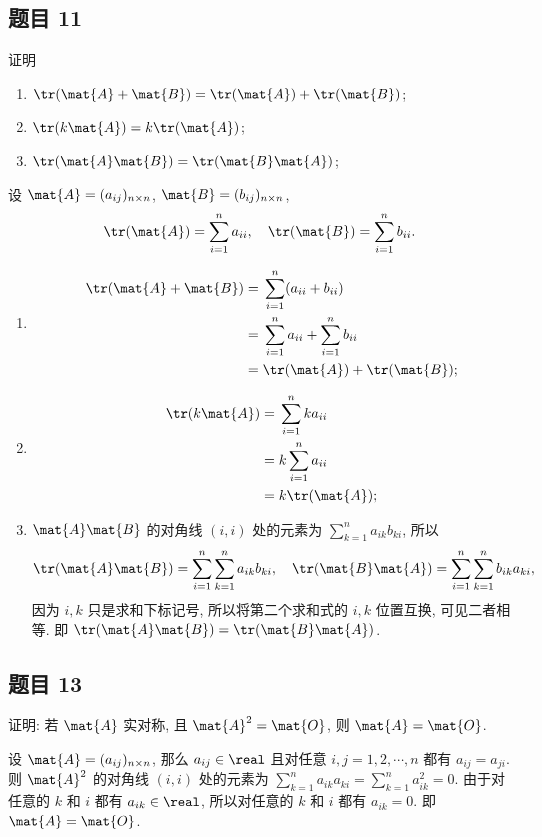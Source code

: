 \subsection*{题目 11}
\begin{problem*}
证明
\begin{enumerate}
    \item $\tr(\mat{A} + \mat{B}) = \tr(\mat{A}) + \tr(\mat{B})$;
    \item $\tr(k\mat{A}) = k\tr(\mat{A})$;
    \item $\tr(\mat{A}\mat{B}) = \tr(\mat{B}\mat{A})$;
\end{enumerate}
\end{problem*}
\begin{solution}
    设 $\mat{A} = (a_{ij})_{n \times n}$, $\mat{B} = (b_{ij})_{n \times n}$,
\[
    \tr(\mat{A}) = \sum_{i = 1}^{n} a_{ii}, \quad \tr(\mat{B}) = \sum_{i = 1}^{n} b_{ii}.
\]
\begin{enumerate}
    \item \[
    \begin{aligned}
        \tr(\mat{A} + \mat{B}) 
        ={}& \sum_{i = 1}^{n} (a_{ii} + b_{ii}) \\
        ={}& \sum_{i = 1}^{n} a_{ii} + \sum_{i = 1}^{n} b_{ii} \\
        ={}& \tr(\mat{A}) + \tr(\mat{B});
    \end{aligned}
    \]
    \item \[
    \begin{aligned}
        \tr(k\mat{A}) 
        ={}& \sum_{i = 1}^{n} ka_{ii} \\
        ={}& k\sum_{i = 1}^{n} a_{ii} \\
        ={}& k\tr(\mat{A});
    \end{aligned}
    \]
    \item $\mat{A}\mat{B}$ 的对角线 $(i, i)$ 处的元素为 $\sum_{k = 1}^{n} a_{ik} b_{ki}$, 所以
    \[
        \tr(\mat{A}\mat{B}) = \sum_{i = 1}^{n} \sum_{k = 1}^{n} a_{ik} b_{ki}, \quad
        \tr(\mat{B}\mat{A}) = \sum_{i = 1}^{n} \sum_{k = 1}^{n} b_{ik} a_{ki},
    \]
    因为 $i, k$ 只是求和下标记号, 所以将第二个求和式的 $i, k$ 位置互换, 可见二者相等. 即 $\tr(\mat{A}\mat{B}) = \tr(\mat{B}\mat{A})$.
\end{enumerate}
\end{solution}

\newpage
\subsection*{题目 13}
\begin{problem*}
证明: 若 $\mat{A}$ 实对称, 且 $\mat{A}^2 = \mat{O}$, 则 $\mat{A} = \mat{O}$.
\end{problem*}
\begin{solution}
设 $\mat{A} = (a_{ij})_{n \times n}$, 那么 $a_{ij} \in \real$ 且对任意 $i, j = 1, 2, \cdots, n$ 都有 $a_{ij} = a_{ji}$. 则 $\mat{A}^2$ 的对角线 $(i, i)$ 处的元素为 $\sum_{k = 1}^{n} a_{ik} a_{ki} = \sum_{k = 1}^{n} a_{ik}^2 = 0$. 由于对任意的 $k$ 和 $i$ 都有 $a_{ik} \in \real$, 所以对任意的 $k$ 和 $i$ 都有 $a_{ik} = 0$. 即 $\mat{A} = \mat{O}$.
\end{solution}

